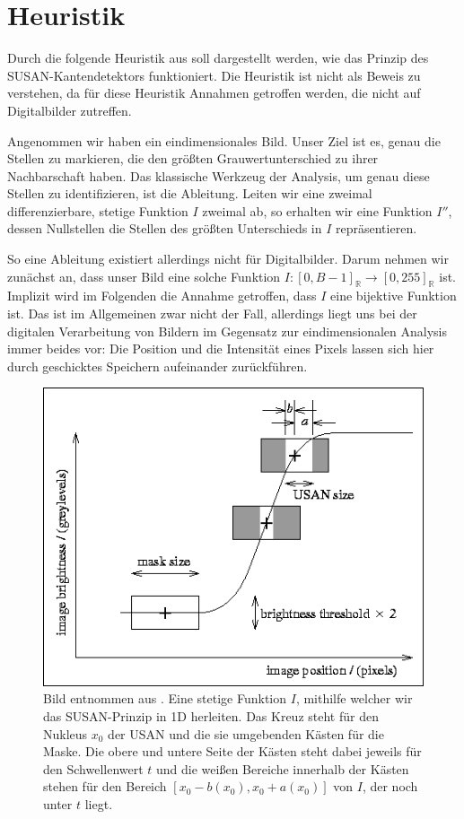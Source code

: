 \documentclass[a4paper, 11pt]{report}
\theoremstyle{definition}
\begin{document}
		\section{Heuristik}\label{sec:heuristic}
			 	Durch die folgende Heuristik aus \cite{SUSAN} soll dargestellt werden, wie das Prinzip des SUSAN-Kantendetektors funktioniert. Die Heuristik ist nicht als Beweis zu verstehen, da für diese Heuristik Annahmen getroffen werden, die nicht auf Digitalbilder zutreffen.

			 	Angenommen wir haben ein eindimensionales Bild. Unser Ziel ist es, genau die Stellen zu markieren, die den größten Grauwertunterschied zu ihrer Nachbarschaft haben. Das klassische Werkzeug der Analysis, um genau diese Stellen zu identifizieren, ist die Ableitung. Leiten wir eine zweimal differenzierbare, stetige Funktion $I$ zweimal ab, so erhalten wir eine Funktion $I''$, dessen Nullstellen die Stellen des größten Unterschieds in $I$ repräsentieren.

			 	So eine Ableitung existiert allerdings nicht für Digitalbilder. Darum nehmen wir zunächst an, dass unser Bild eine solche Funktion $I: [0, B-1]_\mathbb{R} \to [0,255]_\mathbb{R}$ ist. Implizit wird im Folgenden die Annahme getroffen, dass $I$ eine bijektive Funktion ist. Das ist im Allgemeinen zwar nicht der Fall, allerdings liegt uns bei der digitalen Verarbeitung von Bildern im Gegensatz zur eindimensionalen Analysis immer beides vor: Die Position und die Intensität eines Pixels lassen sich hier durch geschicktes Speichern aufeinander zurückführen.

			 	\begin{figure}[H]
			 		\centering
			 		\includegraphics[width=.7\textwidth]{assets/susan-graph.png}
			 		\caption{Bild entnommen aus \cite{SUSAN}. Eine stetige Funktion $I$, mithilfe welcher wir das SUSAN-Prinzip in 1D herleiten. Das Kreuz steht für den Nukleus $x_0$ der USAN und die sie umgebenden Kästen für die Maske. Die obere und untere Seite der Kästen steht dabei jeweils für den Schwellenwert $t$ und die weißen Bereiche innerhalb der Kästen stehen für den Bereich $[x_0 - b(x_0), x_0 + a(x_0)]$ von $I$, der noch unter $t$ liegt.}
			 		\label{fig:susan-graph}
			 	\end{figure}
\end{document}
